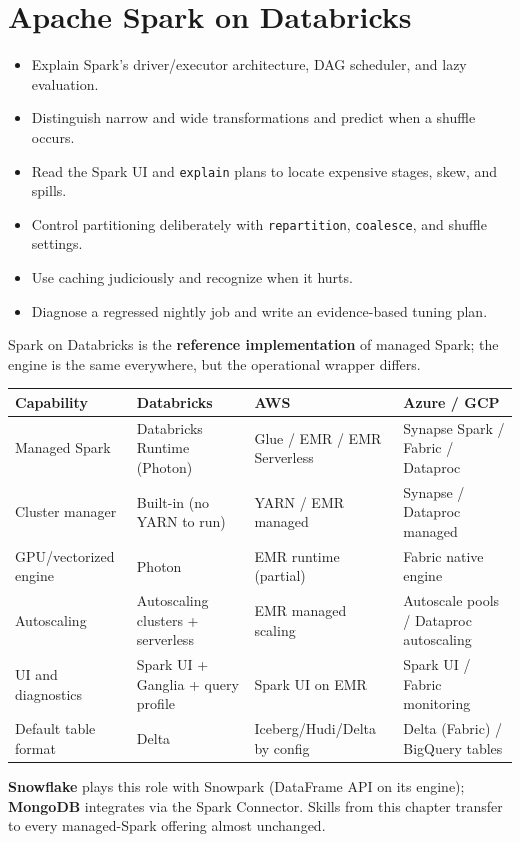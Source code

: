 \chapter{Apache Spark on Databricks}
%
%
\begin{objectives}
\begin{itemize}
    \item Explain Spark's driver/executor architecture, DAG scheduler, and lazy evaluation.
    \item Distinguish narrow and wide transformations and predict when a shuffle occurs.
    \item Read the Spark UI and \texttt{explain} plans to locate expensive stages, skew, and spills.
    \item Control partitioning deliberately with \texttt{repartition}, \texttt{coalesce}, and shuffle settings.
    \item Use caching judiciously and recognize when it hurts.
    \item Diagnose a regressed nightly job and write an evidence-based tuning plan.
\end{itemize}
\end{objectives}

\begin{crosscloud}
Spark on Databricks is the \textbf{reference implementation} of managed Spark; the engine is the
same everywhere, but the operational wrapper differs.

\vspace{2mm}
{\footnotesize
\begin{tabular}{@{}p{3.0cm}p{3.4cm}p{3.2cm}p{3.2cm}@{}}
\toprule
\textbf{Capability} & \textbf{Databricks} & \textbf{AWS} & \textbf{Azure / GCP} \\
\midrule
Managed Spark & Databricks Runtime (Photon) & Glue / EMR / EMR Serverless & Synapse Spark / Fabric / Dataproc \\
Cluster manager & Built-in (no YARN to run) & YARN / EMR managed & Synapse / Dataproc managed \\
GPU/vectorized engine & Photon & EMR runtime (partial) & Fabric native engine \\
Autoscaling & Autoscaling clusters + serverless & EMR managed scaling & Autoscale pools / Dataproc autoscaling \\
UI and diagnostics & Spark UI + Ganglia + query profile & Spark UI on EMR & Spark UI / Fabric monitoring \\
Default table format & Delta & Iceberg/Hudi/Delta by config & Delta (Fabric) / BigQuery tables \\
\bottomrule
\end{tabular}}

\vspace{1mm}
\textbf{Snowflake} plays this role with Snowpark (DataFrame API on its engine); \textbf{MongoDB}
integrates via the Spark Connector. Skills from this chapter transfer to every managed-Spark
offering almost unchanged.
\end{crosscloud}

